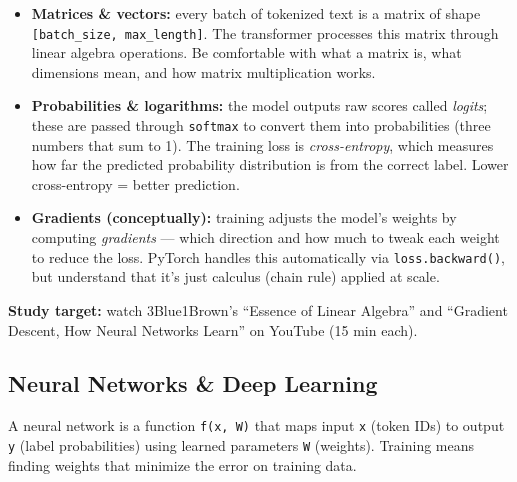 \begin{itemize}[nosep]
    \item \textbf{Matrices \& vectors:} every batch of tokenized text is a matrix of shape \texttt{[batch\_size, max\_length]}. The transformer processes this matrix through linear algebra operations. Be comfortable with what a matrix is, what dimensions mean, and how matrix multiplication works.
    \item \textbf{Probabilities \& logarithms:} the model outputs raw scores called \textit{logits}; these are passed through \texttt{softmax} to convert them into probabilities (three numbers that sum to 1). The training loss is \textit{cross-entropy}, which measures how far the predicted probability distribution is from the correct label. Lower cross-entropy = better prediction.
    \item \textbf{Gradients (conceptually):} training adjusts the model's weights by computing \textit{gradients} --- which direction and how much to tweak each weight to reduce the loss. PyTorch handles this automatically via \texttt{loss.backward()}, but understand that it's just calculus (chain rule) applied at scale.
\end{itemize}

\textbf{Study target:} watch 3Blue1Brown's ``Essence of Linear Algebra'' and ``Gradient Descent, How Neural Networks Learn'' on YouTube (15 min each).

\subsection{Neural Networks \& Deep Learning}

A neural network is a function \texttt{f(x, W)} that maps input \texttt{x} (token IDs) to output \texttt{y} (label probabilities) using learned parameters \texttt{W} (weights). Training means finding weights that minimize the error on training data.

